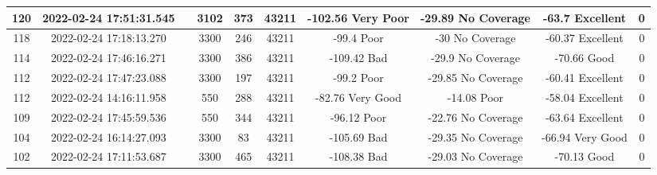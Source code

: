 \begin{longtable*}{|c|c|c|c|c|c|c|c|c|c|}
120&2022-02-24 17:51:31.545&&3102&373&43211& -102.56   Very Poor   & -29.89    No Coverage & -63.7     Excellent   & 0\\\hline
{}118&2022-02-24 17:18:13.270&&3300&246&43211& -99.4     Poor        & -30       No Coverage & -60.37    Excellent   & 0\\\hline
{}114&2022-02-24 17:46:16.271&&3300&386&43211& -109.42   Bad         & -29.9     No Coverage & -70.66    Good        & 0\\\hline
{}112&2022-02-24 17:47:23.088&&3300&197&43211& -99.2     Poor        & -29.85    No Coverage & -60.41    Excellent   & 0\\\hline
{}112&2022-02-24 14:16:11.958&&550&288&43211& -82.76    Very Good   & -14.08    Poor        & -58.04    Excellent   & 0\\\hline
{}109&2022-02-24 17:45:59.536&&550&344&43211& -96.12    Poor        & -22.76    No Coverage & -63.64    Excellent   & 0\\\hline
{}104&2022-02-24 16:14:27.093&&3300&83&43211& -105.69   Bad         & -29.35    No Coverage & -66.94    Very Good   & 0\\\hline
{}102&2022-02-24 17:11:53.687&&3300&465&43211& -108.38   Bad         & -29.03    No Coverage & -70.13    Good        & 0\\\hline

\end{longtable*}
